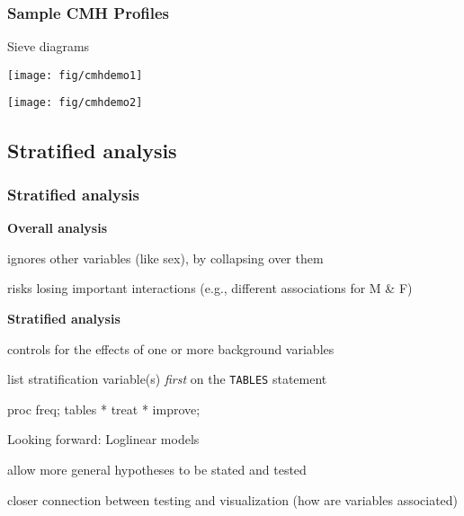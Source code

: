 \begin{frame}
  \frametitle{Sample CMH Profiles}
 Sieve diagrams

\vspace{2ex}
 \begin{minipage}[b]{.5\linewidth}
  \centering
  \texttt{[image: fig/cmhdemo1]}
 \end{minipage}%
 \begin{minipage}[b]{.5\linewidth}
  \centering
  \texttt{[image: fig/cmhdemo2]}
 \end{minipage}
\end{frame}

\subsection{Stratified analysis}
\begin{frame}[fragile]
  \frametitle{Stratified analysis}
  \begin{block}{\large\bfseries Overall analysis}
      \begin{itemize*}
	  \item ignores other variables (like sex), by collapsing over them
	  \item risks losing important interactions (e.g., different associations for M \& F)
	  \end{itemize*}
  \end{block}
  \begin{block}{\large\bfseries Stratified analysis}
      \begin{itemize*}
	  \item controls for the effects of one or more background variables
	  \item list stratification variable(s) \emph{first} on the \texttt{TABLES} statement
\begin{listing}[frame=single]
proc freq;
   tables  * treat * improve;
\end{listing}
	  \end{itemize*}
  \end{block}
  \begin{block}{Looking forward: Loglinear models}
      \begin{itemize*}
	  \item allow more general hypotheses to be stated and tested
	  \item closer connection between testing and visualization (\alert{how} are variables associated)
 	  \end{itemize*}
 \end{block}
\end{frame}

